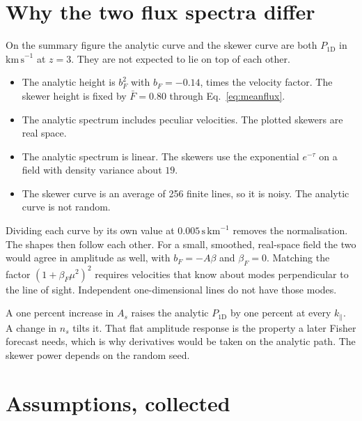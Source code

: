 \documentclass[11pt]{article}
\begin{document}
\section{Why the two flux spectra differ}
\label{sec:compare}

On the summary figure the analytic curve and the skewer curve are both $P_{1\mathrm{D}}$ in $\mathrm{km\,s}^{-1}$ at $z=3$. They are not expected to lie on top of each other.
\begin{itemize}
\item The analytic height is $b_F^{2}$ with $b_F=-0.14$, times the velocity factor. The skewer height is fixed by $\bar F=0.80$ through Eq.~\eqref{eq:meanflux}.
\item The analytic spectrum includes peculiar velocities. The plotted skewers are real space.
\item The analytic spectrum is linear. The skewers use the exponential $e^{-\tau}$ on a field with density variance about $19$.
\item The skewer curve is an average of 256 finite lines, so it is noisy. The analytic curve is not random.
\end{itemize}
Dividing each curve by its own value at $0.005\,\mathrm{s\,km}^{-1}$ removes the normalisation. The shapes then follow each other. For a small, smoothed, real-space field the two would agree in amplitude as well, with $b_F=-A\beta$ and $\beta_F=0$. Matching the factor $(1+\beta_F\mu^{2})^{2}$ requires velocities that know about modes perpendicular to the line of sight. Independent one-dimensional lines do not have those modes.

A one percent increase in $A_s$ raises the analytic $P_{1\mathrm{D}}$ by one percent at every $k_\parallel$. A change in $n_s$ tilts it. That flat amplitude response is the property a later Fisher forecast needs, which is why derivatives would be taken on the analytic path. The skewer power depends on the random seed.

\section{Assumptions, collected}
\label{sec:assumptions}
\end{document}
